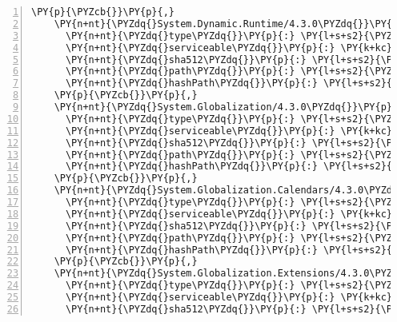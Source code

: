 \begin{Verbatim}[commandchars=\\\{\},numbers=left,firstnumber=1,stepnumber=1,numberblanklines=0]
    \PY{p}{\PYZcb{}}\PY{p}{,}
    \PY{n+nt}{\PYZdq{}System.Dynamic.Runtime/4.3.0\PYZdq{}}\PY{p}{:} \PY{p}{\PYZob{}}
      \PY{n+nt}{\PYZdq{}type\PYZdq{}}\PY{p}{:} \PY{l+s+s2}{\PYZdq{}package\PYZdq{}}\PY{p}{,}
      \PY{n+nt}{\PYZdq{}serviceable\PYZdq{}}\PY{p}{:} \PY{k+kc}{true}\PY{p}{,}
      \PY{n+nt}{\PYZdq{}sha512\PYZdq{}}\PY{p}{:} \PY{l+s+s2}{\PYZdq{}sha512\PYZhy{}SNVi1E/vfWUAs/WYKhE9+qlS6KqK0YVhnlT0HQtr8pMIA8YX3lwy3uPMownDwdYISBdmAF/2holEIldVp85Wag==\PYZdq{}}\PY{p}{,}
      \PY{n+nt}{\PYZdq{}path\PYZdq{}}\PY{p}{:} \PY{l+s+s2}{\PYZdq{}system.dynamic.runtime/4.3.0\PYZdq{}}\PY{p}{,}
      \PY{n+nt}{\PYZdq{}hashPath\PYZdq{}}\PY{p}{:} \PY{l+s+s2}{\PYZdq{}system.dynamic.runtime.4.3.0.nupkg.sha512\PYZdq{}}
    \PY{p}{\PYZcb{}}\PY{p}{,}
    \PY{n+nt}{\PYZdq{}System.Globalization/4.3.0\PYZdq{}}\PY{p}{:} \PY{p}{\PYZob{}}
      \PY{n+nt}{\PYZdq{}type\PYZdq{}}\PY{p}{:} \PY{l+s+s2}{\PYZdq{}package\PYZdq{}}\PY{p}{,}
      \PY{n+nt}{\PYZdq{}serviceable\PYZdq{}}\PY{p}{:} \PY{k+kc}{true}\PY{p}{,}
      \PY{n+nt}{\PYZdq{}sha512\PYZdq{}}\PY{p}{:} \PY{l+s+s2}{\PYZdq{}sha512\PYZhy{}kYdVd2f2PAdFGblzFswE4hkNANJBKRmsfa2X5LG2AcWE1c7/4t0pYae1L8vfZ5xvE2nK/R9JprtToA61OSHWIg==\PYZdq{}}\PY{p}{,}
      \PY{n+nt}{\PYZdq{}path\PYZdq{}}\PY{p}{:} \PY{l+s+s2}{\PYZdq{}system.globalization/4.3.0\PYZdq{}}\PY{p}{,}
      \PY{n+nt}{\PYZdq{}hashPath\PYZdq{}}\PY{p}{:} \PY{l+s+s2}{\PYZdq{}system.globalization.4.3.0.nupkg.sha512\PYZdq{}}
    \PY{p}{\PYZcb{}}\PY{p}{,}
    \PY{n+nt}{\PYZdq{}System.Globalization.Calendars/4.3.0\PYZdq{}}\PY{p}{:} \PY{p}{\PYZob{}}
      \PY{n+nt}{\PYZdq{}type\PYZdq{}}\PY{p}{:} \PY{l+s+s2}{\PYZdq{}package\PYZdq{}}\PY{p}{,}
      \PY{n+nt}{\PYZdq{}serviceable\PYZdq{}}\PY{p}{:} \PY{k+kc}{true}\PY{p}{,}
      \PY{n+nt}{\PYZdq{}sha512\PYZdq{}}\PY{p}{:} \PY{l+s+s2}{\PYZdq{}sha512\PYZhy{}GUlBtdOWT4LTV3I+9/PJW+56AnnChTaOqqTLFtdmype/L500M2LIyXgmtd9X2P2VOkmJd5c67H5SaC2QcL1bFA==\PYZdq{}}\PY{p}{,}
      \PY{n+nt}{\PYZdq{}path\PYZdq{}}\PY{p}{:} \PY{l+s+s2}{\PYZdq{}system.globalization.calendars/4.3.0\PYZdq{}}\PY{p}{,}
      \PY{n+nt}{\PYZdq{}hashPath\PYZdq{}}\PY{p}{:} \PY{l+s+s2}{\PYZdq{}system.globalization.calendars.4.3.0.nupkg.sha512\PYZdq{}}
    \PY{p}{\PYZcb{}}\PY{p}{,}
    \PY{n+nt}{\PYZdq{}System.Globalization.Extensions/4.3.0\PYZdq{}}\PY{p}{:} \PY{p}{\PYZob{}}
      \PY{n+nt}{\PYZdq{}type\PYZdq{}}\PY{p}{:} \PY{l+s+s2}{\PYZdq{}package\PYZdq{}}\PY{p}{,}
      \PY{n+nt}{\PYZdq{}serviceable\PYZdq{}}\PY{p}{:} \PY{k+kc}{true}\PY{p}{,}
      \PY{n+nt}{\PYZdq{}sha512\PYZdq{}}\PY{p}{:} \PY{l+s+s2}{\PYZdq{}sha512\PYZhy{}FhKmdR6MPG+pxow6wGtNAWdZh7noIOpdD5TwQ3CprzgIE1bBBoim0vbR1+AWsWjQmU7zXHgQo4TWSP6lCeiWcQ==\PYZdq{}}\PY{p}{,}

\end{Verbatim}
